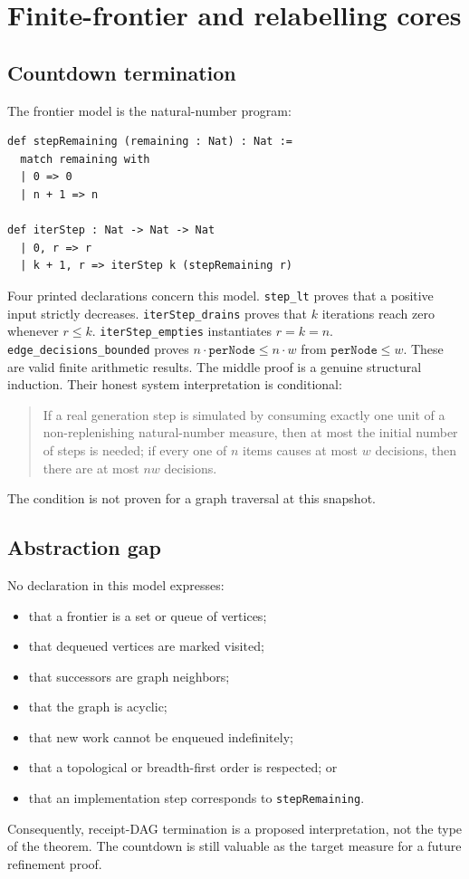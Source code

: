 \documentclass[10pt,letterpaper]{article}
\theoremstyle{definition}
\begin{document}
\section{Finite-frontier and relabelling cores}\label{sec:frontier}
\subsection{Countdown termination}
The frontier model is the natural-number program:
\begin{lstlisting}[language={},caption={The entire state transition for frontier termination.}]
def stepRemaining (remaining : Nat) : Nat :=
  match remaining with
  | 0 => 0
  | n + 1 => n

def iterStep : Nat -> Nat -> Nat
  | 0, r => r
  | k + 1, r => iterStep k (stepRemaining r)
\end{lstlisting}
Four printed declarations concern this model.
\texttt{step\_lt} proves that a positive input strictly decreases.
\texttt{iterStep\_drains} proves that \(k\) iterations reach zero whenever
\(r\leq k\). \texttt{iterStep\_empties} instantiates \(r=k=n\).
\texttt{edge\_decisions\_bounded} proves
\(n\cdot\texttt{perNode}\leq n\cdot w\) from
\(\texttt{perNode}\leq w\).
These are valid finite arithmetic results. The middle proof is a genuine
structural induction. Their honest system interpretation is conditional:
\begin{quote}
If a real generation step is simulated by consuming exactly one unit of a
non-replenishing natural-number measure, then at most the initial number of
steps is needed; if every one of \(n\) items causes at most \(w\) decisions,
then there are at most \(nw\) decisions.
\end{quote}
The condition is not proven for a graph traversal at this snapshot.

\subsection{Abstraction gap}
No declaration in this model expresses:
\begin{itemize}
\item that a frontier is a set or queue of vertices;
\item that dequeued vertices are marked visited;
\item that successors are graph neighbors;
\item that the graph is acyclic;
\item that new work cannot be enqueued indefinitely;
\item that a topological or breadth-first order is respected; or
\item that an implementation step corresponds to \texttt{stepRemaining}.
\end{itemize}
Consequently, receipt-DAG termination is a proposed interpretation, not the
type of the theorem. The countdown is still valuable as the target measure for
a future refinement proof.
\end{document}
